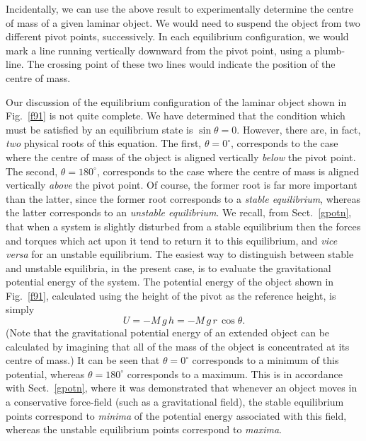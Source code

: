 Incidentally, we can use the above result to experimentally determine the centre of mass of a given
laminar object. We would need to suspend the object from two different pivot points,
successively. In each equilibrium configuration, we would  mark a line running vertically
downward from the pivot point, using a plumb-line. The crossing point of these
two lines would  indicate the position of the centre of mass.

Our discussion of the equilibrium configuration of the laminar object
shown in Fig.~\ref{f91} is not quite complete. We have determined that the
condition which must be satisfied by an equilibrium state is $\sin\theta =0$. 
However, there are, in fact, {\em two}
physical roots
of this equation. The first, $\theta = 0^\circ$, corresponds to the case
where the centre of mass of the object is aligned vertically {\em below} the
pivot point. The second, $\theta =180^\circ$, corresponds to the 
case where the centre of mass  is aligned vertically {\em above} the
pivot point. Of course, the former root is far more important than the latter, since the
former root corresponds to a {\em stable equilibrium}, whereas the latter 
corresponds to an {\em unstable equilibrium}. We recall, from Sect.~\ref{gpotn}, that
when a system is slightly disturbed from a stable equilibrium  then the
forces and torques which act upon it tend to return it to this equilibrium, and
{\em vice versa} for an unstable equilibrium. The easiest way to distinguish between
stable and unstable equilibria, in the present case, is to evaluate the gravitational
potential energy of the system. The potential energy of the object shown
in Fig.~\ref{f91}, calculated using the height of the pivot as the reference height,
is simply
\begin{equation}
U = - M\,g\,h = -M\,g\,r\,\cos\theta.
\end{equation}
(Note that the gravitational potential energy of an extended object
can be calculated by imagining that all of the mass of the object is
concentrated at its centre of mass.)
It can be seen that $\theta=0^\circ$ corresponds to a minimum of this potential, 
whereas $\theta =180^\circ$ corresponds to a maximum. This is in accordance with 
 Sect.~\ref{gpotn}, where it was demonstrated that whenever an object moves
in a conservative force-field (such as a gravitational field),  the stable equilibrium
points correspond to {\em minima} of the potential energy associated with this field, whereas the
unstable equilibrium points correspond to {\em maxima}.

